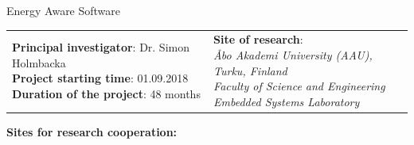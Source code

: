 \documentclass{article}
\begin{document}
\huge{Energy Aware Software}

\begin{table}[h]
\begin{tabular}{  l  l  }
\pbox{15cm}{\normalsize\textbf{Principal investigator}: Dr. Simon Holmbacka\\\textbf{Project starting time}: 01.09.2018\\\textbf{Duration of the project}: 48 months\\} & 
\pbox{10cm}{\textbf{Site of research}:\\\textit{\AA{}bo Akademi University (AAU), Turku, Finland}\\\textit{Faculty of Science and Engineering}\\\textit{Embedded Systems Laboratory}}
 
\end{tabular}
\label{tab:strconf}
\end{table}
\normalsize
\textbf{Sites for research cooperation:}
\end{document}
